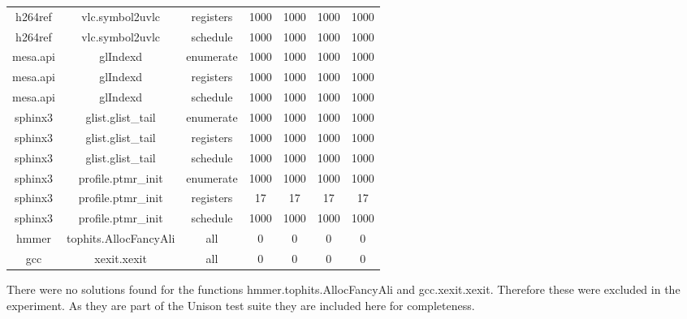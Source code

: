 \begin{center}
\begin{longtable}{c|c|c|c|c|c|c}
		h264ref & vlc.symbol2uvlc & registers & 1000 & 1000 & 1000 & 1000 \\
		h264ref & vlc.symbol2uvlc & schedule & 1000 & 1000 & 1000 & 1000 \\
		\hline
		mesa.api & glIndexd & enumerate & 1000 & 1000 & 1000 & 1000 \\
		mesa.api & glIndexd & registers & 1000 & 1000 & 1000 & 1000 \\
		mesa.api & glIndexd & schedule & 1000 & 1000 & 1000 & 1000 \\
		\hline
		sphinx3 & glist.glist\_tail & enumerate & 1000 & 1000 & 1000 & 1000 \\
		sphinx3 & glist.glist\_tail & registers & 1000 & 1000 & 1000 & 1000 \\
		sphinx3 & glist.glist\_tail & schedule & 1000 & 1000 & 1000 & 1000 \\
		\hline
		sphinx3 & profile.ptmr\_init & enumerate & 1000 & 1000 & 1000 & 1000 \\
		sphinx3 & profile.ptmr\_init & registers & 17 & 17 & 17 & 17 \\
		sphinx3 & profile.ptmr\_init & schedule & 1000 & 1000 & 1000 & 1000 \\
		\hline
		hmmer & tophits.AllocFancyAli & all & 0 &0 &0 &0 \\
		gcc & xexit.xexit & all & 0 &0 &0 &0 \\
	\end{longtable}
	\endgroup
\end{center}

There were no solutions found for the functions hmmer.tophits.AllocFancyAli and 
gcc.xexit.xexit. Therefore these were excluded in the experiment. As they are part of the
Unison test suite they are included here for completeness.
